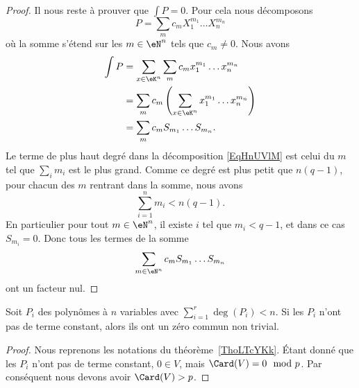 \begin{proof}
	Il nous reste à prouver que \( \int P=0\). Pour cela nous décomposons
	\begin{equation}        \label{EqHnUVlM}
		P=\sum_m c_mX_1^{m_1}\ldots X_n^{m_n}
	\end{equation}
	où la somme s'étend sur les \( m\in \eN^n\) tels que \( c_m\neq 0\). Nous avons
	\begin{subequations}
		\begin{align}
			\int P & =\sum_{x\in \eK^n}\sum_mc_m x_1^{m_1}\ldots x_n^{m_n}                  \\
			       & =\sum_{m}c_m\left( \sum_{x\in \eK^n}x_1^{m_1}\ldots x_n^{m_n} \right)  \\
			       & =\sum_m c_m S_{m_1}\ldots S_{m_n}.
		\end{align}
	\end{subequations}
	Le terme de plus haut degré dans la décomposition \eqref{EqHnUVlM} est celui du \( m\) tel que \( \sum_im_i\) est le plus grand. Comme ce degré est plus petit que \( n(q-1)\), pour chacun des \( m\) rentrant dans la somme, nous avons
	\begin{equation}
		\sum_{i=1}^nm_i<n(q-1).
	\end{equation}
	En particulier pour tout \( m\in \eN^n\), il existe \( i\) tel que \( m_i<q-1\), et dans ce cas \( S_{m_i}=0\). Donc tous les termes de la somme
	\begin{equation}
		\sum_{m\in \eN^n}c_mS_{m_1}\ldots S_{m_n}
	\end{equation}
	ont un facteur nul.
\end{proof}

\begin{corollary}       \label{CorfuHNKz}
	Soit \( P_i\) des polynômes à \( n\) variables avec \( \sum_{i=1}^r\deg(P_i)<n\). Si les \( P_i\) n'ont pas de terme constant, alors ils ont un zéro commun non trivial.
\end{corollary}

\begin{proof}
	Nous reprenons les notations du théorème~\ref{ThoLTcYKk}. Étant donné que les \( P_i\) n'ont pas de terme constant, \( 0\in V\), mais \( \Card(V)=0\mod p\). Par conséquent nous devons avoir \( \Card(V)>p\).
\end{proof}

